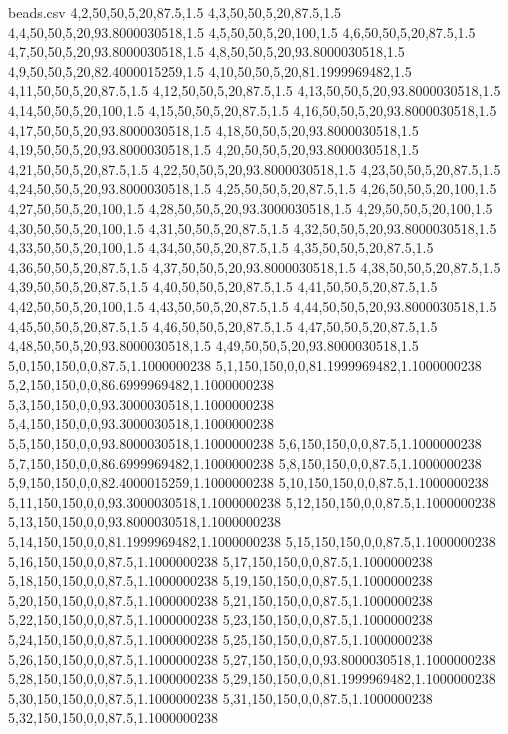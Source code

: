 \begin{filecontents*}{beads.csv}
4,2,50,50,5,20,87.5,1.5
4,3,50,50,5,20,87.5,1.5
4,4,50,50,5,20,93.8000030518,1.5
4,5,50,50,5,20,100,1.5
4,6,50,50,5,20,87.5,1.5
4,7,50,50,5,20,93.8000030518,1.5
4,8,50,50,5,20,93.8000030518,1.5
4,9,50,50,5,20,82.4000015259,1.5
4,10,50,50,5,20,81.1999969482,1.5
4,11,50,50,5,20,87.5,1.5
4,12,50,50,5,20,87.5,1.5
4,13,50,50,5,20,93.8000030518,1.5
4,14,50,50,5,20,100,1.5
4,15,50,50,5,20,87.5,1.5
4,16,50,50,5,20,93.8000030518,1.5
4,17,50,50,5,20,93.8000030518,1.5
4,18,50,50,5,20,93.8000030518,1.5
4,19,50,50,5,20,93.8000030518,1.5
4,20,50,50,5,20,93.8000030518,1.5
4,21,50,50,5,20,87.5,1.5
4,22,50,50,5,20,93.8000030518,1.5
4,23,50,50,5,20,87.5,1.5
4,24,50,50,5,20,93.8000030518,1.5
4,25,50,50,5,20,87.5,1.5
4,26,50,50,5,20,100,1.5
4,27,50,50,5,20,100,1.5
4,28,50,50,5,20,93.3000030518,1.5
4,29,50,50,5,20,100,1.5
4,30,50,50,5,20,100,1.5
4,31,50,50,5,20,87.5,1.5
4,32,50,50,5,20,93.8000030518,1.5
4,33,50,50,5,20,100,1.5
4,34,50,50,5,20,87.5,1.5
4,35,50,50,5,20,87.5,1.5
4,36,50,50,5,20,87.5,1.5
4,37,50,50,5,20,93.8000030518,1.5
4,38,50,50,5,20,87.5,1.5
4,39,50,50,5,20,87.5,1.5
4,40,50,50,5,20,87.5,1.5
4,41,50,50,5,20,87.5,1.5
4,42,50,50,5,20,100,1.5
4,43,50,50,5,20,87.5,1.5
4,44,50,50,5,20,93.8000030518,1.5
4,45,50,50,5,20,87.5,1.5
4,46,50,50,5,20,87.5,1.5
4,47,50,50,5,20,87.5,1.5
4,48,50,50,5,20,93.8000030518,1.5
4,49,50,50,5,20,93.8000030518,1.5
5,0,150,150,0,0,87.5,1.1000000238
5,1,150,150,0,0,81.1999969482,1.1000000238
5,2,150,150,0,0,86.6999969482,1.1000000238
5,3,150,150,0,0,93.3000030518,1.1000000238
5,4,150,150,0,0,93.3000030518,1.1000000238
5,5,150,150,0,0,93.8000030518,1.1000000238
5,6,150,150,0,0,87.5,1.1000000238
5,7,150,150,0,0,86.6999969482,1.1000000238
5,8,150,150,0,0,87.5,1.1000000238
5,9,150,150,0,0,82.4000015259,1.1000000238
5,10,150,150,0,0,87.5,1.1000000238
5,11,150,150,0,0,93.3000030518,1.1000000238
5,12,150,150,0,0,87.5,1.1000000238
5,13,150,150,0,0,93.8000030518,1.1000000238
5,14,150,150,0,0,81.1999969482,1.1000000238
5,15,150,150,0,0,87.5,1.1000000238
5,16,150,150,0,0,87.5,1.1000000238
5,17,150,150,0,0,87.5,1.1000000238
5,18,150,150,0,0,87.5,1.1000000238
5,19,150,150,0,0,87.5,1.1000000238
5,20,150,150,0,0,87.5,1.1000000238
5,21,150,150,0,0,87.5,1.1000000238
5,22,150,150,0,0,87.5,1.1000000238
5,23,150,150,0,0,87.5,1.1000000238
5,24,150,150,0,0,87.5,1.1000000238
5,25,150,150,0,0,87.5,1.1000000238
5,26,150,150,0,0,87.5,1.1000000238
5,27,150,150,0,0,93.8000030518,1.1000000238
5,28,150,150,0,0,87.5,1.1000000238
5,29,150,150,0,0,81.1999969482,1.1000000238
5,30,150,150,0,0,87.5,1.1000000238
5,31,150,150,0,0,87.5,1.1000000238
5,32,150,150,0,0,87.5,1.1000000238

\end{filecontents*}
